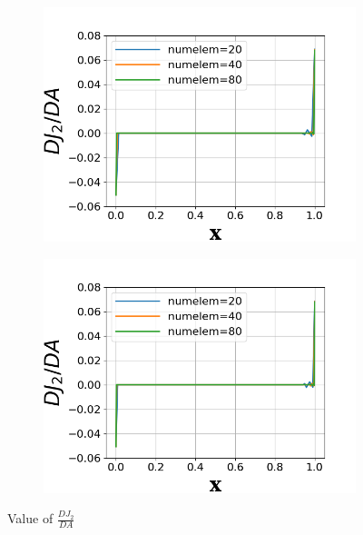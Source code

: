 \documentclass[a4paper]{article}
\begin{document}
\begin{figure}[!htbp]
\begin{subfigure}{0.45\textwidth}
    \includegraphics[width=1.0\linewidth]{figures/DJ2DA_p3.png}
    \label{fig:Dj2_p3}
  \end{subfigure}
  \begin{subfigure}{0.45\textwidth}
    \centering
    \includegraphics[width=1.0\linewidth]{figures/DJ2DA_p4.png}
    \label{fig:Dj2_p4}
  \end{subfigure}
  \caption{Value of $\frac{DJ_2}{DA}$} 
  \label{fig:dJ2dA}
\end{figure}



\end{document}
